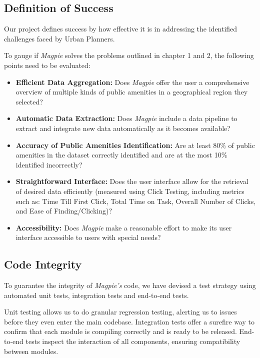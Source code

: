 \subsection{Definition of Success}
Our project defines success by how effective it is in addressing the identified
challenges faced by Urban Planners.

\noindent{}To gauge if \textit{Magpie} solves the problems outlined in chapter 1
and 2, the following points need to be evaluated:
\vspace{-3mm}
\begin{itemize}
  \item{\textbf{Efficient Data Aggregation:} Does \textit{Magpie} offer the user
  a comprehensive overview of multiple kinds of public amenities in a
  geographical region they selected?}
  \item{\textbf{Automatic Data Extraction:} Does \textit{Magpie} include a data
  pipeline to extract and integrate new data automatically as it becomes
  available?}
  \item{\textbf{Accuracy of Public Amenities Identification:} Are at least 80\%
  of public amenities in the dataset correctly identified and are at the most
  10\% identified incorrectly?}
  \item{\textbf{Straightforward Interface:} Does the user interface allow for
  the retrieval of desired data efficiently (measured using Click Testing,
  including metrics such as: Time Till First Click, Total Time on Task, Overall
  Number of Clicks, and Ease of Finding/Clicking)?}
  \item{\textbf{Accessibility:} Does \textit{Magpie} make a reasonable effort to
  make its user interface accessible to users with special needs?}
\end{itemize}

\pagebreak{}

\subsection{Code Integrity}
To guarantee the integrity of \textit{Magpie's} code, we have devised a test
strategy using automated unit tests, integration tests and end-to-end tests.

\noindent{}Unit testing allows us to do granular regression testing, alerting us
to issues before they even enter the main codebase. Integration tests offer a
surefire way to confirm that each module is compiling correctly and is ready to
be released. End-to-end tests inspect the interaction of all components,
ensuring compatibility between modules.

